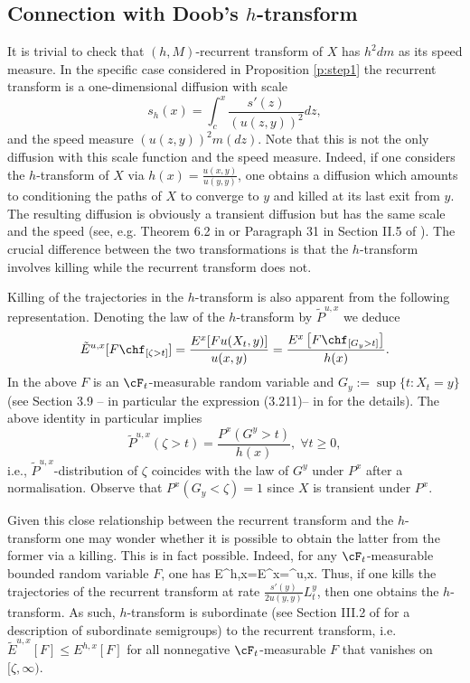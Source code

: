 \documentclass[11pt,reqno]{amsart}
\numberwithin{equation}{section}
\begin{document}
\subsection{Connection with Doob's $h$-transform} \label{s:rvsh} It is trivial to check that $(h,M)$-recurrent transform of $X$ has $h^2dm$ as its speed measure. In the specific case considered in Proposition \ref{p:step1} the recurrent transform is a one-dimensional diffusion with scale
\[
s_h(x)=\int_c^x \frac{s'(z)}{(u(z,y))^2}dz,
\]
and the speed measure $(u(z,y))^2m(dz)$. Note that this is not the only diffusion with this scale function and the speed measure. Indeed, if one considers the $h$-transform of $X$ via $h(x)=\frac{u(x,y)}{u(y,y)}$, one obtains a diffusion which amounts to conditioning the paths of $X$ to converge to $y$ and killed at its last exit from $y$. The resulting diffusion is obviously a transient diffusion but has the same scale and the speed (see, e.g. Theorem 6.2 in \cite{EH} or Paragraph 31 in Section II.5 of \cite{BorSal}). The crucial difference between the two transformations is that the $h$-transform  involves killing while the recurrent transform does not. 

Killing of the trajectories in the $h$-transform is also apparent from the following representation. Denoting the law of the $h$-transform by $\tilde{P}^{u,x}$ we deduce 
\[
\tilde{E}^{u,x}[F\chf_{[\zeta>t]}]=\frac{E^x[F u(X_t,y)]}{u(x,y)}=\frac{E^x\left[F\chf_{[G_y>t]}\right]}{h(x)}.
\]
In the above $F$ is an $\cF_t$-measurable random variable and $G_y:=\sup\{t:X_t=y\}$ (see Section 3.9 -- in particular the expression (3.211)-- in \cite{MR} for the  details). The above identity in particular implies
\[
\tilde{P}^{u,x}(\zeta>t)=\frac{P^x(G^y>t)}{h(x)}, \; \forall t\geq 0,
\]
i.e., $\tilde{P}^{u,x}$-distribution of $\zeta$ coincides with the law of $G^y$ under $P^x$ after a normalisation. Observe that $P^x(G_y<\zeta)=1$ since $X$ is transient under $P^x$. 

Given this close relationship between the recurrent transform and the $h$-transform one may wonder whether it is possible to obtain the latter from the former via a killing. This is in fact possible. Indeed, for any $\cF_t$-measurable bounded random variable $F$, one has
\be \label{e:killRT}
E^{h,x}=E^{x}=^{u,x}.
\ee
Thus, if one kills the trajectories of the recurrent transform at rate $\frac{s'(y)}{2 u(y,y)}L^y_t$, then one obtains the $h$-transform. As such, $h$-transform is subordinate (see Section III.2 of \cite{BG} for a description of subordinate semigroups) to the recurrent transform, i.e. $\tilde{E}^{u,x}\left[F\right]\leq  E^{h,x}\left[F\right]$ for all nonnegative  $\cF_t$-measurable  $F$  that vanishes on $[\zeta,\infty)$. 
\end{document}
